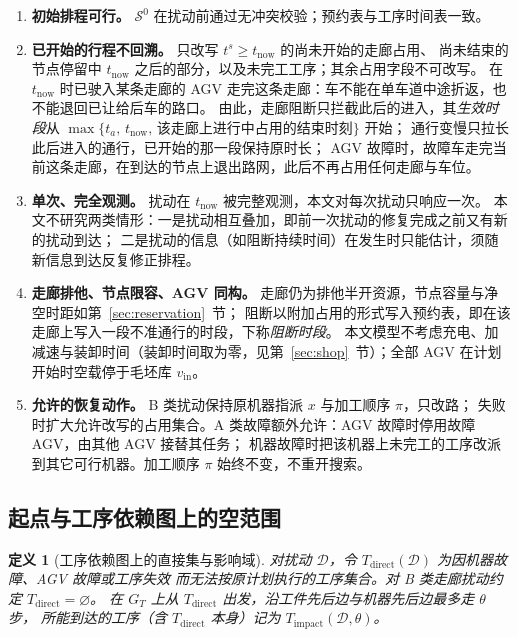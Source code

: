 \documentclass[manuscript,screen,review]{acmart}
\newtheorem{definition}{定义}
\begin{document}
\begin{enumerate}[label=\textbf{A\arabic*.},leftmargin=*,topsep=2pt,itemsep=2pt]
\item \textbf{初始排程可行。} \(\mathcal{S}^0\) 在扰动前通过无冲突校验；预约表与工序时间表一致。
\item \textbf{已开始的行程不回溯。} 只改写 \(t^s\ge t_{\mathrm{now}}\) 的尚未开始的走廊占用、
尚未结束的节点停留中 \(t_{\mathrm{now}}\) 之后的部分，以及未完工工序；其余占用字段不可改写。
在 \(t_{\mathrm{now}}\) 时已驶入某条走廊的 AGV 走完这条走廊：车不能在单车道中途折返，也不能退回已让给后车的路口。
由此，走廊阻断只拦截此后的进入，其\emph{生效时段}从 \(\max\{t_a,\,t_{\mathrm{now}},\,\text{该走廊上进行中占用的结束时刻}\}\) 开始；
通行变慢只拉长此后进入的通行，已开始的那一段保持原时长；
AGV 故障时，故障车走完当前这条走廊，在到达的节点上退出路网，此后不再占用任何走廊与车位。
\item \textbf{单次、完全观测。} 扰动在 \(t_{\mathrm{now}}\) 被完整观测，本文对每次扰动只响应一次。
本文不研究两类情形：一是扰动相互叠加，即前一次扰动的修复完成之前又有新的扰动到达；
二是扰动的信息（如阻断持续时间）在发生时只能估计，须随新信息到达反复修正排程。
\item \textbf{走廊排他、节点限容、AGV 同构。} 走廊仍为排他半开资源，节点容量与净空时距如第~\ref{sec:reservation}~节；
阻断以附加占用的形式写入预约表，即在该走廊上写入一段不准通行的时段，下称\emph{阻断时段}。
本文模型不考虑充电、加减速与装卸时间（装卸时间取为零，见第~\ref{sec:shop}~节）；全部 AGV 在计划开始时空载停于毛坯库 \(v_{\mathrm{in}}\)。
\item \textbf{允许的恢复动作。} B 类扰动保持原机器指派 \(x\) 与加工顺序 \(\pi\)，只改路；
失败时扩大允许改写的占用集合。A 类故障额外允许：AGV 故障时停用故障 AGV，由其他 AGV 接替其任务；
机器故障时把该机器上未完工的工序改派到其它可行机器。加工顺序 \(\pi\) 始终不变，不重开搜索。
\end{enumerate}

\subsection{起点与工序依赖图上的空范围}
\label{sec:seeds_miss}

\begin{definition}[工序依赖图上的直接集与影响域]
\label{def:task_impact}
对扰动 \(\mathcal{D}\)，令 \(T_{\mathrm{direct}}(\mathcal{D})\) 为因机器故障、AGV 故障或工序失效
而无法按原计划执行的工序集合。对 B 类走廊扰动约定 \(T_{\mathrm{direct}}=\varnothing\)。
在 \(G_T\) 上从 \(T_{\mathrm{direct}}\) 出发，沿工件先后边与机器先后边最多走 \(\theta\) 步，
所能到达的工序（含 \(T_{\mathrm{direct}}\) 本身）记为 \(T_{\mathrm{impact}}(\mathcal{D},\theta)\)。
\end{definition}
\end{document}
